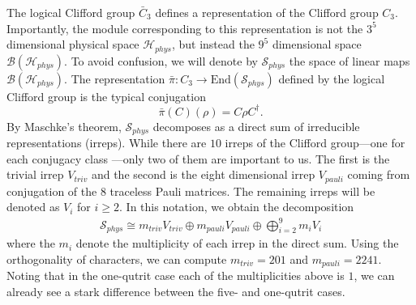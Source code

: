 The logical Clifford group $\bar{C}_3$ defines a representation of the Clifford group $C_3$.
Importantly, the module corresponding to this representation is not the $3^5$ dimensional physical space $\mathcal{H}_{phys}$, but instead the $9^5$ dimensional space $\mathcal{B}({\mathcal{H}_{phys}})$.
To avoid confusion, we will denote by $\mathcal{S}_{phys}$ the space of linear maps $\mathcal{B}(\mathcal{H}_{phys})$.
The representation $\bar{\pi} : C_3 \to 
\mathrm{End}(\mathcal{S}_{phys})$ defined by the logical Clifford group is the typical conjugation
$$
\bar{\pi}(C)(\rho) = C \rho C^\dagger.
$$
By Maschke's theorem, $\mathcal{S}_{phys}$ decomposes as a direct sum of irreducible representations (irreps).
While there are $10$ irreps of the Clifford group---one for each conjugacy class ---only two of them are important to us.
The first is the trivial irrep $V_{triv}$ and the second is the eight dimensional irrep $V_{pauli}$ coming from conjugation of the $8$ traceless Pauli matrices.
The remaining irreps will be denoted as $V_i$ for $i \geq 2$. In this notation, we obtain the decomposition
\begin{align}
    \mathcal{S}_{phys} \cong m_{triv} V_{triv} \oplus m_{pauli} V_{pauli} \oplus \bigoplus_{i = 2}^{9} m_i V_i
\end{align}
where the $m_i$ denote the multiplicity of each irrep in the direct sum.
Using the orthogonality of characters, we can compute $m_{triv} = 201$ and $m_{pauli} = 2241$.
Noting that in the one-qutrit case each of the multiplicities above is $1$, we can already see a stark difference between the five- and one-qutrit cases.

